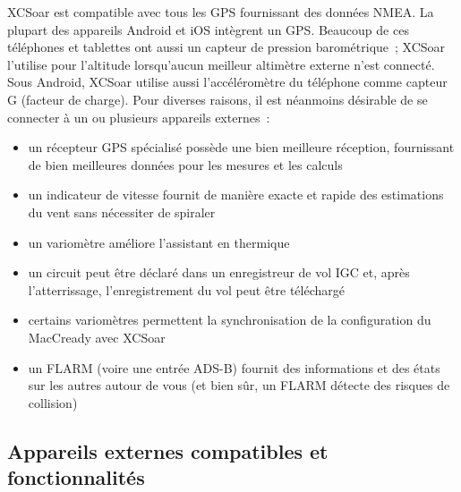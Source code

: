 XCSoar est compatible avec tous les GPS fournissant des données NMEA. La plupart
des appareils Android et iOS intègrent un GPS. Beaucoup de ces téléphones et
tablettes ont aussi un capteur de pression barométrique~; XCSoar l'utilise pour
l'altitude lorsqu'aucun meilleur altimètre externe n'est connecté. Sous Android,
XCSoar utilise aussi l'accéléromètre du téléphone comme capteur G (facteur de
charge). Pour diverses
raisons, il est néanmoins désirable de se connecter à un ou plusieurs appareils
externes~:
\begin{itemize}
\item un récepteur GPS spécialisé possède une bien meilleure réception, fournissant de bien
meilleures données pour les mesures et les calculs
\item un indicateur de vitesse fournit de manière exacte et rapide des estimations du vent
 sans nécessiter de spiraler
\item un variomètre améliore l'assistant en thermique
\item un circuit peut être déclaré dans un enregistreur de vol IGC et, après l'atterrissage, l'enregistrement
du vol peut être téléchargé
\item certains variomètres permettent la synchronisation de la configuration du MacCready avec
 XCSoar
\item un FLARM (voire une entrée ADS-B) fournit des informations et des états sur les autres
autour de vous (et bien sûr, un FLARM détecte des risques de collision)
\end{itemize}

\subsection*{Appareils externes compatibles et fonctionnalités}
\label{sec:supported-varios}


